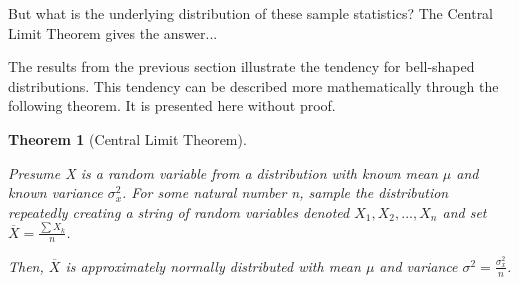 \documentclass[10pt,]{book}
\theoremstyle{plain}
\newtheorem{theorem}{Theorem}[section]
\theoremstyle{definition}
\theoremstyle{definition}
\theoremstyle{definition}
\numberwithin{equation}{section}
\begin{document}
But what is the underlying distribution of these sample statistics?  The Central Limit Theorem gives the answer...%
\par
The results from the previous section illustrate the tendency for bell-shaped distributions. This tendency can be described more mathematically through the following theorem. It is presented here without proof.
%
\begin{theorem}[{Central Limit Theorem}]\label{theorem-64}

	Presume X is a random variable from a distribution with known mean \(\mu\) and known variance \(\sigma_x^2\).  
	For some natural number n, sample the distribution repeatedly creating a string of random variables denoted \(X_1, X_2, ... , X_n\) and set \(\overline{X} = \frac{\sum X_k}{n}\). 
\par
 
	Then, \(\overline{X}\) is approximately normally distributed with mean \(\mu\) and variance \(\sigma^2 = \frac{\sigma_x^2}{n}\).
\end{theorem}
\par
\end{document}
